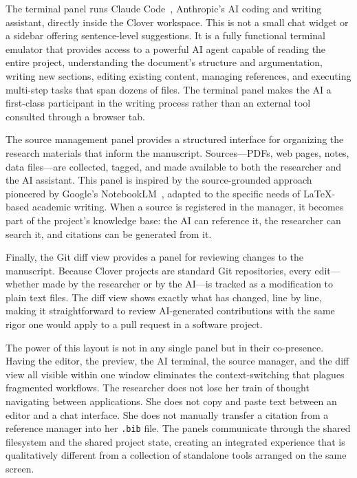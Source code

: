 \documentclass[a4paper,11pt]{article}
\begin{document}
The terminal panel runs Claude Code~\cite{ClaudeCode}, Anthropic's AI coding and writing assistant, directly inside the Clover workspace. This is not a small chat widget or a sidebar offering sentence-level suggestions. It is a fully functional terminal emulator that provides access to a powerful AI agent capable of reading the entire project, understanding the document's structure and argumentation, writing new sections, editing existing content, managing references, and executing multi-step tasks that span dozens of files. The terminal panel makes the AI a first-class participant in the writing process rather than an external tool consulted through a browser tab.

The source management panel provides a structured interface for organizing the research materials that inform the manuscript. Sources---PDFs, web pages, notes, data files---are collected, tagged, and made available to both the researcher and the AI assistant. This panel is inspired by the source-grounded approach pioneered by Google's NotebookLM~\cite{NotebookLM}, adapted to the specific needs of \LaTeX{}-based academic writing. When a source is registered in the manager, it becomes part of the project's knowledge base: the AI can reference it, the researcher can search it, and citations can be generated from it.

Finally, the Git diff view provides a panel for reviewing changes to the manuscript. Because Clover projects are standard Git repositories, every edit---whether made by the researcher or by the AI---is tracked as a modification to plain text files. The diff view shows exactly what has changed, line by line, making it straightforward to review AI-generated contributions with the same rigor one would apply to a pull request in a software project.

The power of this layout is not in any single panel but in their co-presence. Having the editor, the preview, the AI terminal, the source manager, and the diff view all visible within one window eliminates the context-switching that plagues fragmented workflows. The researcher does not lose her train of thought navigating between applications. She does not copy and paste text between an editor and a chat interface. She does not manually transfer a citation from a reference manager into her \texttt{.bib} file. The panels communicate through the shared filesystem and the shared project state, creating an integrated experience that is qualitatively different from a collection of standalone tools arranged on the same screen.
\end{document}
